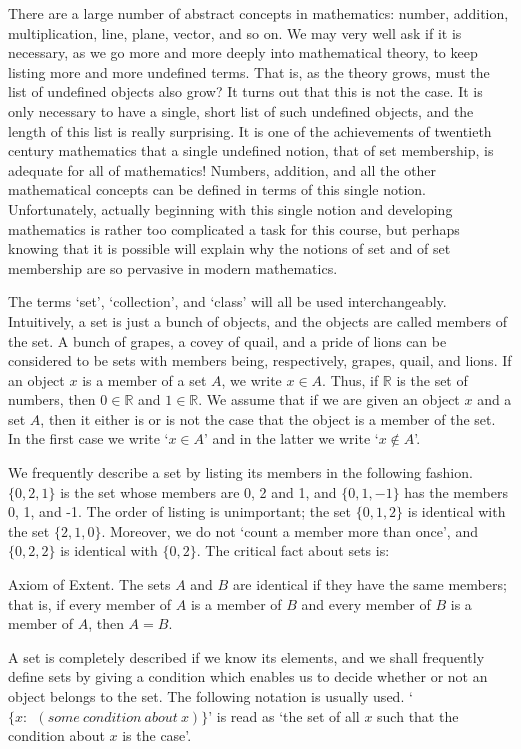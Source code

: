 \documentclass[a4paper]{article}
\begin{document}
There are a large number of abstract concepts in mathematics: number, addition, multiplication, line, plane, vector, and so on.
We may very well ask if it is necessary, as we go more and more deeply into mathematical theory, to keep listing more and more
undefined terms. That is, as the theory grows, must the list of undefined objects also grow? It turns out that this is not the
case. It is only necessary to have a single, short list of such undefined objects, and the length of this list is really
surprising. It is one of the achievements of twentieth century mathematics that a single undefined notion, that of set membership,
is adequate for all of mathematics! Numbers, addition, and all the other mathematical concepts can be defined in terms of this
single notion. Unfortunately, actually beginning with this single notion and developing mathematics is rather too complicated
a task for this course, but perhaps knowing that it is possible will explain why the notions of set and of set membership are
so pervasive in modern mathematics.

The terms `set', `collection', and `class' will all be used interchangeably. Intuitively, a set is just a bunch of objects,
and the objects are called members of the set. A bunch of grapes, a covey of quail, and a pride of lions can be considered to be
sets with members being, respectively, grapes, quail, and lions. If an object $x$ is a member of a set $A$, we write $x \in A$.
Thus, if $\mathbb{R}$ is the set of numbers, then $0 \in \mathbb{R}$ and $1 \in \mathbb{R}$. We assume that if we are given an
object $x$ and a set $A$, then it either is or is not the case that the object is a member of the set. In the first case we
write `$x \in A$' and in the latter we write `$x \notin A$'.

We frequently describe a set by listing its members in the following fashion. $\{0,2,1\}$ is the set whose members are 0, 2
and 1, and $\{0, 1, -1\}$ has the members 0, 1, and -1. The order of listing is unimportant; the set $\{0, 1, 2\}$ is identical
with the set $\{2, 1, 0\}$. Moreover, we do not `count a member more than once', and $\{0,2,2\}$ is identical with $\{0,2\}$.
The critical fact about sets is:

Axiom of Extent. The sets $A$ and $B$ are identical if they have the same members; that is, if every member of $A$ is a member
of $B$ and every member of $B$ is a member of $A$, then $A = B$.

A set is completely described if we know its elements, and we shall frequently define sets by giving a condition which enables
us to decide whether or not an object belongs to the set. The following notation is usually used. `$\{x:~~(some~condition~
about~x)\}$' is read as `the set of all $x$ such that the condition about $x$ is the case'.
\end{document}

